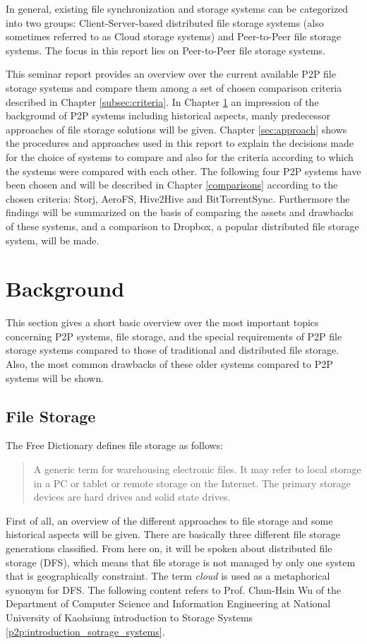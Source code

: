 In general, existing file synchronization and storage systems can be categorized into two groups: Client-Server-based distributed file storage systems (also sometimes referred to as Cloud storage systems) and Peer-to-Peer file storage systems. The focus in this report lies on Peer-to-Peer file storage systems.

This seminar report provides an overview over the current available P2P file storage systems and compare them among a set of chosen comparison criteria described in Chapter \ref{subsec:criteria}. In Chapter \ref{sec:background} an impression of the background of P2P systems including historical aspects, manly predecessor approaches of file storage solutions will be given. Chapter \ref{sec:approach} shows the procedures and approaches used in this report to explain the decisions made for the choice of systems to compare and also for the criteria according to which the systems were compared with each other. The following four P2P systems have been chosen and will be described in Chapter \ref{comparisons} according to the chosen criteria: Storj, AeroFS, Hive2Hive and BitTorrentSync. Furthermore the findings will be summarized on the basis of comparing the assets and drawbacks of these systems, and a comparison to Dropbox, a popular distributed file storage system, will be made.

\section{Background}
\label{sec:background}
This section gives a short basic overview over the most important topics concerning P2P systems, file storage, and the special requirements of P2P file storage systems compared to those of traditional and distributed file storage. Also, the most common drawbacks of these older systems compared to P2P systems will be shown.

\subsection{File Storage}
The Free Dictionary defines file storage as follows:
\begin{quote}
A generic term for warehousing electronic files. It may refer to local storage in a PC or tablet or remote storage on the Internet. The primary storage devices are hard drives and solid state drives. \cite{thefreedictionary}
\end{quote}
First of all, an overview of the different approaches to file storage and some historical aspects will be given. There are basically three different file storage generations classified. From here on, it will be spoken about distributed file storage (DFS), which means that file storage is not managed by only one system that is geographically constraint. The term \textit{cloud} is used as a metaphorical synonym for DFS. The following content refers to Prof. Chun-Hsin Wu of the Department of Computer Science and Information Engineering at National University of Kaohsiung introduction to Storage Systems \ref{p2p:introduction_sotrage_systems}.


